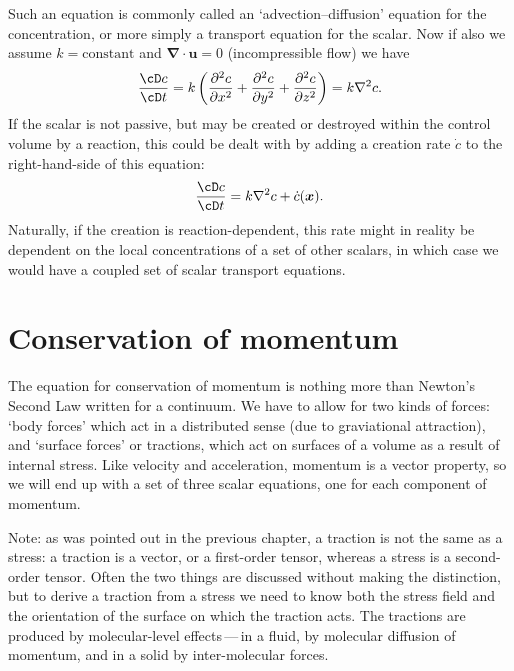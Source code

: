\documentclass[a4paper,11pt]		{report}
\begin{document}
Such an equation is commonly called an `advection--diffusion' equation
for the concentration, or more simply a transport equation for the
scalar.  Now if also we assume $k=\textrm{constant}$ and
$\bm{\nabla\cdot u}=0$ (incompressible flow) we have
\begin{equation}
\frac{\cD c}{\cD t}=
k\left(\frac{\partial^2 c}{\partial x^2} + \frac{\partial^2
  c}{\partial y^2}+ \frac{\partial^2 c}{\partial z^2}\right)=
k\nabla^2 c.
\end{equation}
If the scalar is not passive, but may be created or destroyed within
the control volume by a reaction, this could be dealt with by adding a
creation rate $\dot{c}$ to the right-hand-side of this equation:
\begin{equation}
\frac{\cD c}{\cD t}=
k\nabla^2 c + \dot{c}(\bm{x}).
\end{equation}
Naturally, if the creation is reaction-dependent, this rate might in
reality be dependent on the local concentrations of a set of other
scalars, in which case we would have a coupled set of scalar transport
equations.

\section{Conservation of momentum}

The equation for conservation of momentum is nothing more than
Newton's Second Law written for a continuum. We have to allow for
two kinds of forces: `body forces' which act in a distributed sense
(\eg due to graviational attraction), and `surface forces' or
tractions, which act on surfaces of a volume as a result of internal
stress.  Like velocity and acceleration, momentum is a vector
property, so we will end up with a set of three scalar equations, one
for each component of momentum.

Note: as was pointed out in the previous chapter, a traction is not
the same as a stress: a traction is a vector, or a first-order tensor,
whereas a stress is a second-order tensor. Often the two things are
discussed without making the distinction, but to derive a traction
from a stress we need to know both the stress field and the
orientation of the surface on which the traction acts. The tractions
are produced by molecular-level effects\,---\,in a fluid, by molecular
diffusion of momentum, and in a solid by inter-molecular forces.

\end{document}
